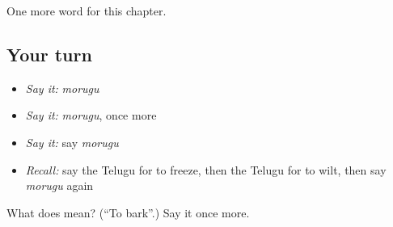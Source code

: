 \begin{grammarlens}[title={What you've built}]
One more word for this chapter.
\end{grammarlens}

\subsection*{Your turn}
\begin{itemize}
\raggedright
  \item \emph{Say it:} \emph{morugu}
  \item \emph{Say it:} \emph{morugu}, once more
  \item \emph{Say it:} say \emph{morugu}
  \item \emph{Recall:} say the Telugu for to freeze, then the Telugu for to wilt, then say \emph{morugu} again
\end{itemize}

\begin{tcolorbox}[breakable,colback=teal!4,colframe=teal!35!black,title={Before you move on}]
What does  mean? (\textquotedblleft{}To bark\textquotedblright{}.) Say it once more.
\end{tcolorbox}
